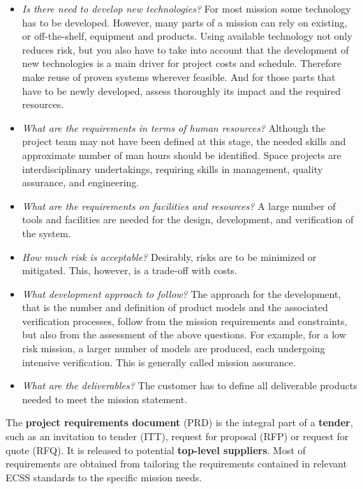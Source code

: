 \begin{itemize}

\item \textit{Is there need to develop new technologies?} For most mission some technology has to be developed. However, many parts of a mission can rely on existing, or off-the-shelf, equipment and products. Using available technology not only reduces risk, but you also have to take into account that the development of new technologies is a main driver for project costs and schedule. Therefore make reuse of proven systems wherever feasible. And for those parts that have to be newly developed, assess thoroughly its impact and the required resources.

\item \textit{What are the requirements in terms of human resources?} Although the project team may not have been defined at this stage, the needed skills and approximate number of man hours should be identified. Space projects are interdisciplinary undertakings, requiring skills in management, quality assurance, and engineering. 

\item \textit{What are the requirements on facilities and resources?} A large number of tools and facilities are needed for the design, development, and verification of the system. 

\item \textit{How much risk is acceptable?} Desirably, risks are to be minimized or mitigated. This, however, is a trade-off with costs. 

\item \textit{What development approach to follow?} The approach for the development, that is the number and definition of product models and the associated verification processes, follow from the mission requirements and constraints, but also from the assessment of the above questions. For example, for a low risk mission, a larger number of models are produced, each undergoing intensive verification. This is generally called mission assurance.

\item \textit{What are the deliverables?} The customer has to define all deliverable products needed to meet the mission statement.

\end{itemize}

The \textbf{project requirements document} (PRD) is the integral part of a \textbf{tender}, such as an invitation to tender (ITT), request for proposal (RFP) or request for quote (RFQ). It is released to potential \textbf{top-level suppliers}. Most of requirements are obtained from tailoring the requirements contained in relevant ECSS standards to the specific mission needs. 

